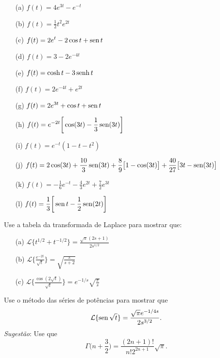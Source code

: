 \begin{Answer}
\begin{itemize}
  \item[(a)] $\displaystyle f(t) = 4e^{3t} - e^{-t}$
  \item[(b)] $\displaystyle f(t) = \frac{1}{2} t^2 e^{2t}$
  \item[(c)] $\displaystyle f(t) = 2e^{t} - 2 \cos t + \operatorname{sen} t$
  \item[(d)] $\displaystyle f(t) = 3 -2 e^{-4t}$
  \item[(e)] $\displaystyle f(t) = \cosh t - 3 \operatorname{senh} t$
  \item[(f)] $\displaystyle f(t) = 2e^{-4t} + e^{2t}$
  \item[(g)] $\displaystyle f(t) = 2e^{3t} + \cos t + \operatorname{sen} t$
  \item[(h)] $\displaystyle f(t) = e^{-2t}\bigg[ \cos(3t) - \frac{1}{3} \operatorname{sen} (3t) \bigg]$
  \item[(i)] $\displaystyle f(t) = e^{-t}(1-t-t^2)$
  \item[(j)] $\displaystyle f(t) = 2\cos(3t) +\frac{10}{3} \operatorname{sen}(3t) +\frac{8}{9} \big[1-\cos(3t)\big] + \frac{40}{27} \big[3t - \operatorname{sen}(3t)\big]$
  \item[(k)] $\displaystyle f(t) = -\frac{1}{6} e^{-t} -\frac{4}{3} e^{2t} + \frac{7}{2} e^{3t}$
  \item[(l)] $\displaystyle f(t) = \frac{1}{3} \bigg[ \operatorname{sen} t - \frac{1}{2}\operatorname{sen}(2t) \bigg]$
\end{itemize}
\end{Answer}


\begin{Exercise}
Use a tabela da transformada de Laplace para mostrar que:

\begin{itemize}
  \item[(a)] $\displaystyle \mathcal{L} \big\{ t^{1/2}+ t^{-1/2} \big\} = \frac{\sqrt{\pi}(2s+1)}{2s^{1/2}}$
  \item[(b)] $\displaystyle \mathcal{L} \bigg\{ \frac{e^{-2t}}{\sqrt{t}} \bigg\} = \sqrt{\frac{\pi}{s+2}}$
  \item[(c)] $\displaystyle \mathcal{L} \bigg\{ \frac{\cos(2\sqrt{t}) }{\sqrt{t}} \bigg\} = e^{-1/s}\sqrt{\frac{\pi}{s}}$
\end{itemize}
\end{Exercise}


\begin{Exercise}
Use o método das séries de potências para mostrar que \[\mathcal{L} \{\operatorname{sen} \sqrt{t} \} =  \frac{\sqrt{\pi} e^{-1/4s}}{2s^{3/2}}.\]
\emph{Sugestão}: Use que \[\Gamma\bigg( n + \frac{3}{2} \bigg) = \frac{ (2n+1)!}{ n! 2^{2n+1}}\sqrt{\pi}.\]
\end{Exercise}


